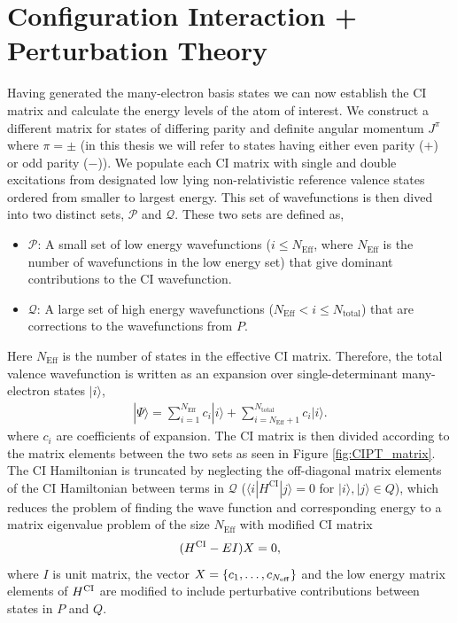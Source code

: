 \documentclass[10pt,a4paper, twoside, openright]{report}
\begin{document}
\section{Configuration Interaction + Perturbation Theory}
Having generated the many-electron basis states we can now establish the CI matrix and calculate the energy levels of the atom of interest. We construct a different matrix for states of differing parity and definite angular momentum $J^{\pi}$ where $\pi = \pm$ (in this thesis we will refer to states having either even parity ($+$) or odd parity ($-$)). We populate each CI matrix with single and double excitations from designated low lying non-relativistic reference valence states ordered from smaller to largest energy.  This set of wavefunctions is then dived into two distinct sets, $\mathcal{P}$ and $\mathcal{Q}$. These two sets are defined as,
\begin{itemize}
\item $\mathcal{P}$: A small set of low energy wavefunctions ($i \leq N_{\text{Eff}}$, where $N_{\text{Eff}}$ is the number of wavefunctions in the low energy set) that give dominant contributions to the CI wavefunction.
\item $\mathcal{Q}$: A large set of high energy wavefunctions ($N_{\text{Eff}}<i \leq N_{\text{total}}$) that are corrections to the wavefunctions from $P$.
\end{itemize}
Here $N_{\text{Eff}}$ is the number of states in the effective CI matrix. Therefore, the total valence wavefunction is written as an expansion over single-determinant many-electron states $|i \rangle $,
\begin{align} 
| \Psi \rangle = \sum_{i=1}^{N_{\text{Eff}}} c_{i}|i\rangle + \sum_{i = N_{\text{Eff}} + 1}^{N_{\text{total}}} c_{i}|i\rangle . \label{eq:psi}
\end{align}
where $c_i$ are coefficients of expansion. The CI matrix is then divided according to the matrix elements between the two sets as seen in Figure \ref{fig:CIPT_matrix}.  The CI Hamiltonian is truncated by neglecting the off-diagonal matrix elements of the CI Hamiltonian between terms in $\mathcal{Q}$ ($\langle i | H^{\text{CI}} | j \rangle = 0 $ for $|i\rangle, |j\rangle \in Q$),  which reduces the problem of finding the wave function and corresponding energy to a matrix eigenvalue problem of the size $N_{\text{Eff}}$ with modified CI matrix
\begin{equation} \label{eq:CI}
(H^{\rm CI} - EI)X=0,
\end{equation}
where $I$ is unit matrix, the vector $X = \{c_1, \dots, c_{N_{\rm eff}}\}$ and the low energy matrix elements of $H^{\rm CI}$ are modified to include perturbative contributions between states in $P$ and $Q$.
\end{document}
